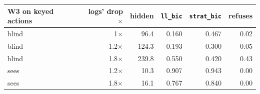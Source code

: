 \begin{tabular}{lrrrrr}
\toprule
W3 on keyed actions & logs' drop $\times$ & hidden & \texttt{ll\_bic} & \texttt{strat\_bic} & refuses \\
\midrule
blind & 1$\times$ & 96.4 & 0.160 & 0.467 & 0.02 \\
blind & 1.2$\times$ & 124.3 & 0.193 & 0.300 & 0.05 \\
blind & 1.8$\times$ & 239.8 & 0.550 & 0.420 & 0.43 \\
sees & 1.2$\times$ & 10.3 & 0.907 & 0.943 & 0.00 \\
sees & 1.8$\times$ & 16.1 & 0.767 & 0.840 & 0.00 \\
\bottomrule
\end{tabular}
\par{}

